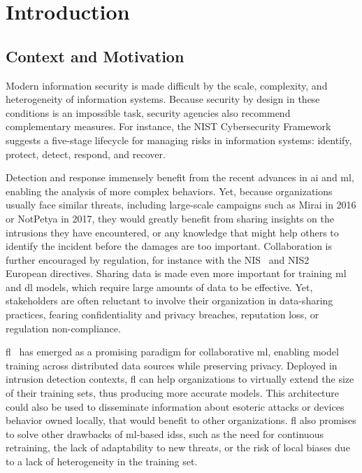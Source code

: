 \chapter{Introduction\label{chap:intro}}
\localtoc

\section{Context and Motivation\label{sec:intro.context}}

Modern information security is made difficult by the scale, complexity, and heterogeneity of information systems.
Because security by design in these conditions is an impossible task, security agencies also recommend complementary measures.
For instance, the NIST Cybersecurity Framework~\cite{nationalinstituteofstandardsandtechnology_NISTCybersecurityFramework_2024} suggests a five-stage lifecycle for managing risks in information systems: identify, protect, detect, respond, and recover.

Detection and response immensely benefit from the recent advances in \gls{ai} and \gls{ml}, enabling the analysis of more complex behaviors.
Yet, because organizations usually face similar threats, including large-scale campaigns such as Mirai in 2016 or NotPetya in 2017, they would greatly benefit from sharing insights on the intrusions they have encountered, or any knowledge that might help others to identify the incident before the damages are too important.
Collaboration is further encouraged by regulation, for instance with the NIS~\cite{NIS2016} and NIS2~\cite{NIS2} European directives.
Sharing data is made even more important for training \gls{ml} and \gls{dl} models, which require large amounts of data to be effective.
Yet, stakeholders are often reluctant to involve their organization in data-sharing practices, fearing confidentiality and privacy breaches, reputation loss, or regulation non-compliance.

\Gls{fl}~\cite{mcmahan_Communicationefficientlearningdeep_2017} has emerged as a promising paradigm for collaborative \gls{ml}, enabling model training across distributed data sources while preserving privacy.
Deployed in intrusion detection contexts, \gls{fl} can help organizations to virtually extend the size of their training sets, thus producing more accurate models.
This architecture could also be used to disseminate information about esoteric attacks or devices behavior owned locally, that would benefit to other organizations.
\Gls{fl} also promises to solve other drawbacks of \gls{ml}-based \glspl{ids}, such as the need for continuous retraining\needref, the lack of adaptability to new threats\needref, or the risk of local biases due to a lack of heterogeneity in the training set\needref.

